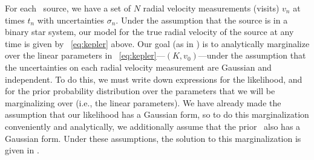 \documentclass[modern]{aastex63}
\begin{document}
For each \apogee\ source, we have a set of $N$ radial velocity measurements
(visits) $v_n$ at times $t_n$ with uncertainties $\sigma_n$.
Under the assumption that the source is in a binary star system, our model for
the true radial velocity of the source at any time is given by
\equationname~\ref{eq:kepler} above.
Our goal (as in \citealt{thejoker}) is to analytically marginalize over the
linear parameters in \equationname~\ref{eq:kepler}---$(K, v_0)$---under the
assumption that the uncertainties on each radial velocity measurement are
Gaussian and independent.
To do this, we must write down expressions for the likelihood, and for the prior
probability distribution over the parameters that we will be marginalizing over
(i.e., the linear parameters).
We have already made the assumption that our likelihood has a Gaussian form, so
to do this marginalization conveniently and analytically, we additionally assume
that the prior \pdf\ also has a Gaussian form.
Under these assumptions, the solution to this marginalization is given in
\cite{Hogg:2020}.
\end{document}
